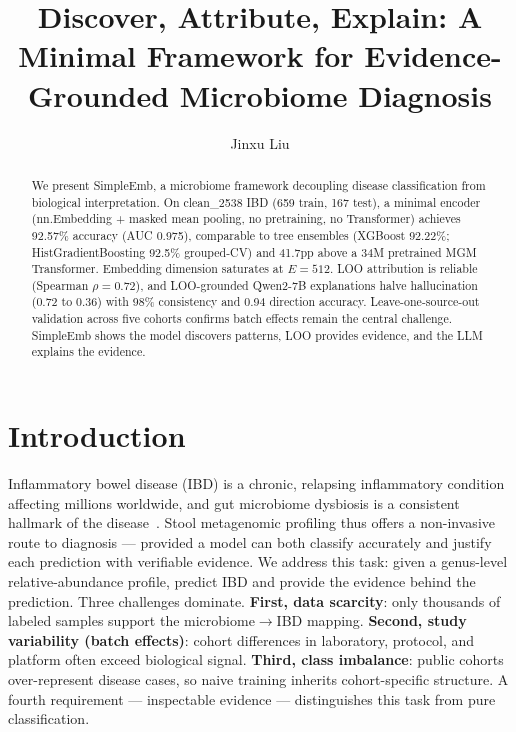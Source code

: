 \documentclass{article} %
\title{Discover, Attribute, Explain: A Minimal Framework for Evidence-Grounded Microbiome Diagnosis}
\author{Jinxu Liu}
\date{}
\begin{document}
\maketitle

\begin{abstract}We present SimpleEmb, a microbiome framework decoupling disease classification from biological interpretation. On clean\_2538 IBD (659 train, 167 test), a minimal encoder (nn.Embedding + masked mean pooling, no pretraining, no Transformer) achieves 92.57\% accuracy (AUC 0.975), comparable to tree ensembles (XGBoost 92.22\%; HistGradientBoosting 92.5\% grouped-CV) and 41.7pp above a 34M pretrained MGM Transformer. Embedding dimension saturates at $E{=}512$. LOO attribution is reliable (Spearman $\rho{=}0.72$), and LOO-grounded Qwen2-7B explanations halve hallucination (0.72 to 0.36) with 98\% consistency and 0.94 direction accuracy. Leave-one-source-out validation across five cohorts confirms batch effects remain the central challenge. SimpleEmb shows the model discovers patterns, LOO provides evidence, and the LLM explains the evidence.\end{abstract}

\section{Introduction}

Inflammatory bowel disease (IBD) is a chronic, relapsing inflammatory condition affecting millions worldwide, and gut microbiome dysbiosis is a consistent hallmark of the disease~\citep{paidimarri2024}. Stool metagenomic profiling thus offers a non-invasive route to diagnosis --- provided a model can both classify accurately and justify each prediction with verifiable evidence. We address this task: given a genus-level relative-abundance profile, predict IBD and provide the evidence behind the prediction. Three challenges dominate. \textbf{First, data scarcity}: only thousands of labeled samples support the microbiome$\rightarrow$IBD mapping. \textbf{Second, study variability (batch effects)}: cohort differences in laboratory, protocol, and platform often exceed biological signal. \textbf{Third, class imbalance}: public cohorts over-represent disease cases, so naive training inherits cohort-specific structure. A fourth requirement --- inspectable evidence --- distinguishes this task from pure classification.
\end{document}
